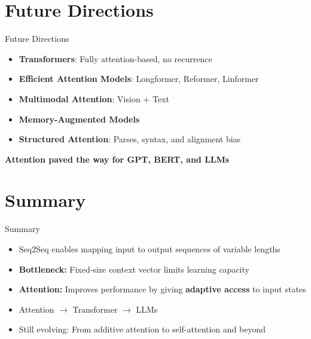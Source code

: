 \section{Future Directions}
\begin{frame}{Future Directions}
    \begin{itemize}
        \setlength{\itemsep}{1em}
        \item \textbf{Transformers}: Fully attention-based, no recurrence
        \item \textbf{Efficient Attention Models}: Longformer, Reformer, Linformer
        \item \textbf{Multimodal Attention}: Vision + Text
        \item \textbf{Memory-Augmented Models}
        \item \textbf{Structured Attention}: Parses, syntax, and alignment bias
    \end{itemize}
    \vspace{1em}
    \textbf{\textcolor{red}{\faBolt} Attention paved the way for \textbf{GPT, BERT, and LLMs}}
\end{frame}


\section{Summary}
\begin{frame}{Summary}
    \begin{itemize}
        \setlength{\itemsep}{1em}
        \item Seq2Seq enables mapping input to output sequences of variable lengths
        \item \textbf{Bottleneck:} Fixed-size context vector limits learning capacity
        \item \textbf{Attention:} Improves performance by giving \textbf{adaptive access} to input states
        \item Attention $\rightarrow$ Transformer $\rightarrow$ LLMs
        \item Still evolving: From additive attention to self-attention and beyond
    \end{itemize}
\end{frame}


